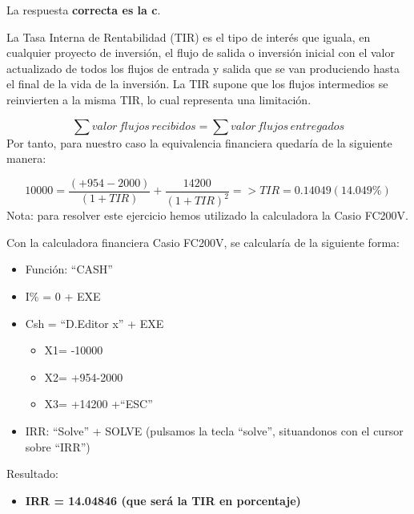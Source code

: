 \documentclass[
  letterpaper,
  DIV=11,
  numbers=noendperiod]{scrreprt}
\providecommand{\tightlist}{%
  \setlength{\itemsep}{0pt}\setlength{\parskip}{0pt}}\usepackage{longtable,booktabs,array}
\begin{document}
\begin{tcolorbox}[enhanced jigsaw, left=2mm, opacityback=0, colback=white, breakable, arc=.35mm, bottomrule=.15mm, rightrule=.15mm, toprule=.15mm, leftrule=.75mm, colframe=quarto-callout-tip-color-frame]
\begin{minipage}[t]{5.5mm}
\textcolor{quarto-callout-tip-color}{\faLightbulb}
\end{minipage}%
\begin{minipage}[t]{\textwidth - 5.5mm}

La respuesta \textbf{correcta es la c}.

La Tasa Interna de Rentabilidad (TIR) es el tipo de interés que iguala,
en cualquier proyecto de inversión, el flujo de salida o inversión
inicial con el valor actualizado de todos los flujos de entrada y salida
que se van produciendo hasta el final de la vida de la inversión. La TIR
supone que los flujos intermedios se reinvierten a la misma TIR, lo cual
representa una limitación.

\[\sum valor\,flujos\,recibidos=\sum valor\,flujos\,entregados\] Por
tanto, para nuestro caso la equivalencia financiera quedaría de la
siguiente manera:

\[10000=\frac{\left(+954-2000\right)}{\left(1+TIR\right)}+\frac{14200}{\left(1+TIR\right)^2}=>TIR=0.14049(14.049\%)\]
Nota: para resolver este ejercicio hemos utilizado la calculadora la
Casio FC200V.

Con la calculadora financiera Casio FC200V, se calcularía de la
siguiente forma:

\begin{itemize}
\item
  Función: ``CASH''
\item
  I\% = 0 + EXE
\item
  Csh = ``D.Editor x'' + EXE

  \begin{itemize}
  \item
    X1= -10000
  \item
    X2= +954-2000
  \item
    X3= +14200 +``ESC''
  \end{itemize}
\item
  IRR: ``Solve'' + SOLVE (pulsamos la tecla ``solve'', situandonos con
  el cursor sobre ``IRR'')
\end{itemize}

Resultado:

\begin{itemize}
\tightlist
\item
  \textbf{IRR = 14.04846 (que será la TIR en porcentaje)}
\end{itemize}

\end{minipage}%
\end{tcolorbox}
\end{document}
